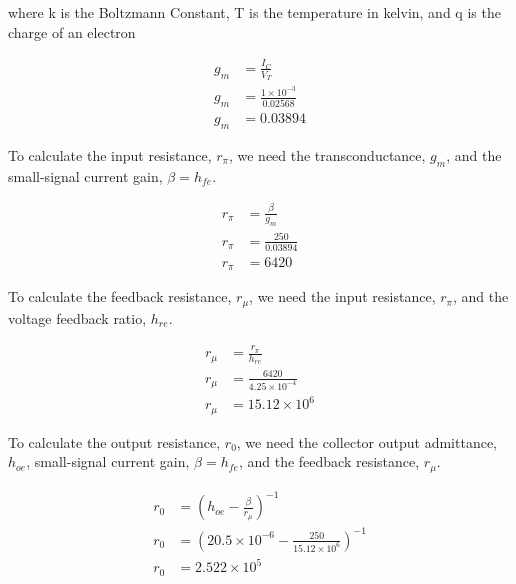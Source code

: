 \documentclass[conference]{IEEEtran}
\begin{document}
where k is the Boltzmann Constant, T is the temperature in kelvin, and q is the charge of an electron

\begin{equation}
    \begin{aligned}
        g_m &= \frac{I_C}{V_T} \\
        g_m &= \frac{1 \times 10^{-3}}{0.02568} \\
        g_m &= 0.03894
    \end{aligned}
\end{equation}

To calculate the input resistance, $r_\pi$, we need the transconductance, $g_m$, and the small-signal current gain, $\beta = h_{fe}$.

\begin{equation}
    \begin{aligned}
        r_{\pi} &= \frac{\beta}{g_m} \\
        r_{\pi} &= \frac{250}{0.03894} \\
        r_{\pi} &= 6420
    \end{aligned}
\end{equation}

To calculate the feedback resistance, $r_{\mu}$, we need the input resistance, $r_{\pi}$, and the voltage feedback ratio, $h_{re}$.

\begin{equation}
    \begin{aligned}
        r_{\mu} &= \frac{r_{\pi}}{h_{re}} \\
        r_{\mu} &= \frac{6420}{4.25 \times 10^{-4}} \\
        r_{\mu} &= 15.12 \times 10^6
    \end{aligned}
\end{equation}

To calculate the output resistance, $r_0$, we need the collector output admittance, $h_{oe}$, small-signal current gain, $\beta = h_{fe}$,
and the feedback resistance, $r_{\mu}$.

\begin{equation}
    \begin{aligned}
        r_0 &= \left(h_{oe} - \frac{\beta}{r_{\mu}} \right)^{-1} \\
        r_0 &= \left(20.5 \times 10^{-6} - \frac{250}{15.12 \times 10^6} \right)^{-1} \\
        r_0 &= 2.522 \times 10^5
    \end{aligned}
\end{equation}
\end{document}
